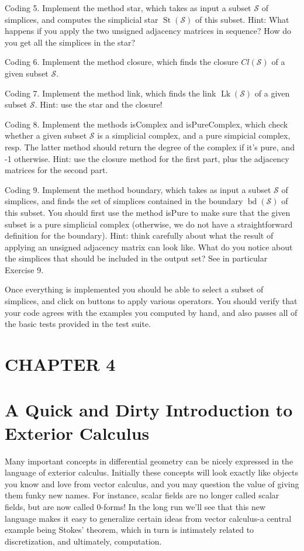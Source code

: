 \documentclass[10pt]{article}
\begin{document}
Coding 5. Implement the method star, which takes as input a subset $\mathcal{S}$ of simplices, and computes the simplicial star $\operatorname{St}(\mathcal{S})$ of this subset. Hint: What happens if you apply the two unsigned adjacency matrices in sequence? How do you get all the simplices in the star?

Coding 6. Implement the method closure, which finds the closure $C l(\mathcal{S})$ of a given subset $\mathcal{S}$.

Coding 7. Implement the method link, which finds the link $\operatorname{Lk}(\mathcal{S})$ of a given subset $\mathcal{S}$. Hint: use the star and the closure!

Coding 8. Implement the methods isComplex and isPureComplex, which check whether a given subset $\mathcal{S}$ is a simplicial complex, and a pure simpicial complex, resp. The latter method should return the degree of the complex if it's pure, and -1 otherwise. Hint: use the closure method for the first part, plus the adjacency matrices for the second part.

Coding 9. Implement the method boundary, which takes as input a subset $\mathcal{S}$ of simplices, and finds the set of simplices contained in the boundary $\operatorname{bd}(\mathcal{S})$ of this subset. You should first use the method isPure to make sure that the given subset is a pure simplicial complex (otherwise, we do not have a straightforward definition for the boundary). Hint: think carefully about what the result of applying an unsigned adjacency matrix can look like. What do you notice about the simplices that should be included in the output set? See in particular Exercise 9.

Once everything is implemented you should be able to select a subset of simplices, and click on buttons to apply various operators. You should verify that your code agrees with the examples you computed by hand, and also passes all of the basic tests provided in the test suite.

\section*{CHAPTER 4}
\section*{A Quick and Dirty Introduction to Exterior Calculus}
Many important concepts in differential geometry can be nicely expressed in the language of exterior calculus. Initially these concepts will look exactly like objects you know and love from vector calculus, and you may question the value of giving them funky new names. For instance, scalar fields are no longer called scalar fields, but are now called 0-forms! In the long run we'll see that this new language makes it easy to generalize certain ideas from vector calculus-a central example being Stokes' theorem, which in turn is intimately related to discretization, and ultimately, computation.
\end{document}
